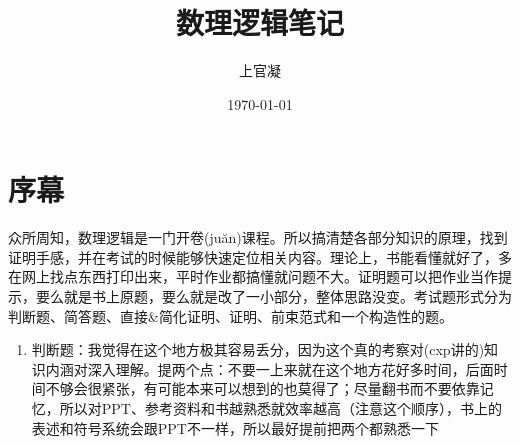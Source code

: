 \documentclass[]{report}
\title{数理逻辑笔记}
\author{上官凝}
\date{\today}
\begin{document}
\theoremstyle{definition} \newtheorem{theorem}{Thm}[section] %
\theoremstyle{definition} \newtheorem{definition}{Def}[section] %
\theoremstyle{plain} \newtheorem{lemma}{lemma}[section] %

	\maketitle
	\newpage


	\section{序幕}
	众所周知，数理逻辑是一门开卷(ju\u an)课程。所以搞清楚各部分知识的原理，找到证明手感，并在考试的时候能够快速定位相关内容。理论上，书能看懂就好了，多在网上找点东西打印出来，平时作业都搞懂就问题不大。证明题可以把作业当作提示，要么就是书上原题，要么就是改了一小部分，整体思路没变。考试题形式分为判断题、简答题、直接\&简化证明、证明、前束范式和一个构造性的题。\par
	\begin{enumerate}
		\item 判断题：我觉得在这个地方极其容易丢分，因为这个真的考察对(cxp讲的)知识内涵对深入理解。提两个点：不要一上来就在这个地方花好多时间，后面时间不够会很紧张，有可能本来可以想到的也莫得了；尽量翻书而不要依靠记忆，所以对PPT、参考资料和书越熟悉就效率越高（注意这个顺序），书上的表述和符号系统会跟PPT不一样，所以最好提前把两个都熟悉一下
	\end{enumerate}
\end{document}
